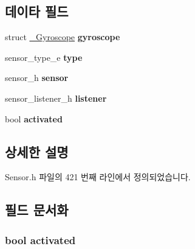 \subsection*{데이타 필드}
\begin{DoxyCompactItemize}
\item 
\hypertarget{struct__GyroscopeExtend_a2836faf982e7b52971a419061d4a4ae7}{struct \hyperlink{struct__Gyroscope}{\-\_\-\-Gyroscope} {\bfseries gyroscope}}\label{struct__GyroscopeExtend_a2836faf982e7b52971a419061d4a4ae7}

\item 
\hypertarget{struct__GyroscopeExtend_abffb09766da2fc510a79bb51f82a36e1}{sensor\-\_\-type\-\_\-e {\bfseries type}}\label{struct__GyroscopeExtend_abffb09766da2fc510a79bb51f82a36e1}

\item 
\hypertarget{struct__GyroscopeExtend_a5bae9b7801bc3808411925cde81d3f26}{sensor\-\_\-h {\bfseries sensor}}\label{struct__GyroscopeExtend_a5bae9b7801bc3808411925cde81d3f26}

\item 
\hypertarget{struct__GyroscopeExtend_aa977dfb866b24fd7d9a20a9a01b2fd1f}{sensor\-\_\-listener\-\_\-h {\bfseries listener}}\label{struct__GyroscopeExtend_aa977dfb866b24fd7d9a20a9a01b2fd1f}

\item 
\hypertarget{struct__GyroscopeExtend_a73e9fa0c3543560192f38a8ab6a78c47}{bool {\bfseries activated}}\label{struct__GyroscopeExtend_a73e9fa0c3543560192f38a8ab6a78c47}

\end{DoxyCompactItemize}


\subsection{상세한 설명}


Sensor.\-h 파일의 421 번째 라인에서 정의되었습니다.



\subsection{필드 문서화}
\hypertarget{struct__GyroscopeExtend_a73e9fa0c3543560192f38a8ab6a78c47}{
\subsubsection[{activated}]{\setlength{\rightskip}{0pt plus 5cm}bool activated}}\label{struct__GyroscopeExtend_a73e9fa0c3543560192f38a8ab6a78c47}


